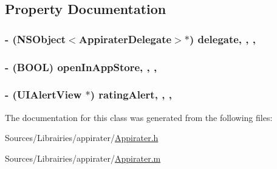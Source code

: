 \subsection{Property Documentation}
\hypertarget{interface_appirater_abf367524b88d89bafca880595f003087}{
\subsubsection[{delegate}]{\setlength{\rightskip}{0pt plus 5cm}-\/ (N\-S\-Object$<${\bf Appirater\-Delegate}$>$$\ast$) delegate\hspace{0.3cm}{\ttfamily [read]}, {\ttfamily [write]}, {\ttfamily [nonatomic]}, {}}}\label{interface_appirater_abf367524b88d89bafca880595f003087}
\hypertarget{interface_appirater_ada11e4951fed6673797426546e6d2b7f}{
\subsubsection[{open\-In\-App\-Store}]{\setlength{\rightskip}{0pt plus 5cm}-\/ (B\-O\-O\-L) open\-In\-App\-Store\hspace{0.3cm}{\ttfamily [read]}, {\ttfamily [write]}, {\ttfamily [nonatomic]}, {\ttfamily [assign]}}}\label{interface_appirater_ada11e4951fed6673797426546e6d2b7f}
\hypertarget{interface_appirater_ac3fe15a27afea8fe203cfd7f9f66d686}{
\subsubsection[{rating\-Alert}]{\setlength{\rightskip}{0pt plus 5cm}-\/ (U\-I\-Alert\-View $\ast$) rating\-Alert\hspace{0.3cm}{\ttfamily [read]}, {\ttfamily [write]}, {\ttfamily [nonatomic]}, {\ttfamily [strong]}}}\label{interface_appirater_ac3fe15a27afea8fe203cfd7f9f66d686}


The documentation for this class was generated from the following files\-:\begin{DoxyCompactItemize}
\item 
Sources/\-Librairies/appirater/\hyperlink{_appirater_8h}{Appirater.\-h}\item 
Sources/\-Librairies/appirater/\hyperlink{_appirater_8m}{Appirater.\-m}\end{DoxyCompactItemize}
